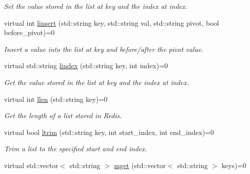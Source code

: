 \begin{DoxyCompactItemize}
\begin{DoxyCompactList}\small\item\em Set the value stored in the list at key and the index at index. \end{DoxyCompactList}\item 
virtual int \hyperlink{classRedisInterface_a3ad704dc93fb00508f55b1e1eb48befa}{linsert} (std\+::string key, std\+::string val, std\+::string pivot, bool before\+\_\+pivot)=0\hypertarget{classRedisInterface_a3ad704dc93fb00508f55b1e1eb48befa}{}\label{classRedisInterface_a3ad704dc93fb00508f55b1e1eb48befa}

\begin{DoxyCompactList}\small\item\em Insert a value into the list at key and before/after the pivot value. \end{DoxyCompactList}\item 
virtual std\+::string \hyperlink{classRedisInterface_a0d5c84fe82cb6b83e37fe1e16941c87f}{lindex} (std\+::string key, int index)=0\hypertarget{classRedisInterface_a0d5c84fe82cb6b83e37fe1e16941c87f}{}\label{classRedisInterface_a0d5c84fe82cb6b83e37fe1e16941c87f}

\begin{DoxyCompactList}\small\item\em Get the value stored in the list at key and the index at index. \end{DoxyCompactList}\item 
virtual int \hyperlink{classRedisInterface_a67309af9d56fc0e8f413897bd5ec2a1f}{llen} (std\+::string key)=0\hypertarget{classRedisInterface_a67309af9d56fc0e8f413897bd5ec2a1f}{}\label{classRedisInterface_a67309af9d56fc0e8f413897bd5ec2a1f}

\begin{DoxyCompactList}\small\item\em Get the length of a list stored in Redis. \end{DoxyCompactList}\item 
virtual bool \hyperlink{classRedisInterface_a65c6e61527d2947eb6055b61eece2f88}{ltrim} (std\+::string key, int start\+\_\+index, int end\+\_\+index)=0\hypertarget{classRedisInterface_a65c6e61527d2947eb6055b61eece2f88}{}\label{classRedisInterface_a65c6e61527d2947eb6055b61eece2f88}

\begin{DoxyCompactList}\small\item\em Trim a list to the specified start and end index. \end{DoxyCompactList}\item 
virtual std\+::vector$<$ std\+::string $>$ \hyperlink{classRedisInterface_a38b721e7e8036bfba391b9ddec1725b5}{mget} (std\+::vector$<$ std\+::string $>$ keys)=0\hypertarget{classRedisInterface_a38b721e7e8036bfba391b9ddec1725b5}{}\label{classRedisInterface_a38b721e7e8036bfba391b9ddec1725b5}


\end{DoxyCompactItemize}
